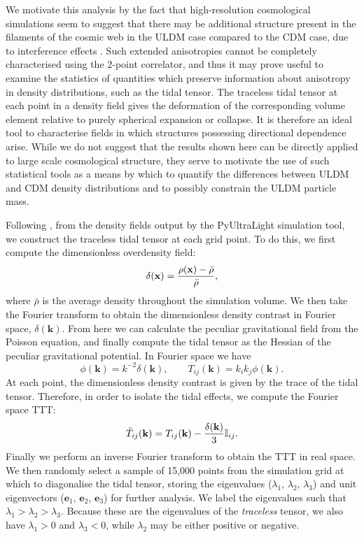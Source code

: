 \documentclass[a4paper,11pt]{article}
\begin{document}
We motivate this analysis by the fact that high-resolution cosmological simulations seem to suggest that there may be additional structure present in the filaments of the cosmic web in the ULDM case compared to the CDM case, due to interference effects \cite{Mocz:2019emo}. Such extended anisotropies cannot be completely characterised using the 2-point correlator, and thus it may prove useful to examine the statistics of quantities which preserve information about anisotropy in density distributions, such as the tidal tensor. The traceless tidal tensor at each point in a density field gives the deformation of the corresponding volume element relative to purely spherical expansion or collapse. It is therefore an ideal tool to characterise fields in which structures possessing directional dependence arise. While we do not suggest that the results shown here can be directly applied to large scale cosmological structure, they serve to motivate the use of such statistical tools as a means by which to quantify the differences between ULDM and CDM density distributions and to possibly constrain the ULDM particle mass. 

Following \cite{Lee:2009uv}, from the density fields output by the {\sc PyUltraLight} simulation tool, we construct the traceless tidal tensor at each grid point. To do this, we first compute the dimensionless overdensity field:
\begin{equation}
    \delta(\mathrm{\mathbf{x}}) = \frac{\rho(\mathrm{\mathbf{x}})-\Bar{\rho}}{\bar{\rho}}, 
\end{equation}
where $\bar{\rho}$ is the average density throughout the simulation volume. We then take the Fourier transform to obtain the dimensionless density contrast in Fourier space, $\delta(\mathrm{\mathbf{k}})$. From here we can calculate the peculiar gravitational field from the Poisson equation, and finally compute the tidal tensor as the Hessian of the peculiar gravitational potential. In Fourier space we have
\begin{equation}
    \phi(\mathrm{\mathbf{k}}) = k^{-2}\delta(\mathrm{\mathbf{k}}), \qquad T_{ij}(\mathrm{\mathbf{k}}) = k_{i}k_{j}\phi(\mathrm{\mathbf{k}}).
\end{equation}
At each point, the dimensionless density contrast is given by the trace of the tidal tensor. Therefore, in order to isolate the tidal effects, we compute the Fourier space TTT:
\begin{equation}
    \Tilde{T}_{ij}(\mathrm{\mathbf{k}}) = T_{ij}(\mathrm{\mathbf{k}}) - \frac{\delta(\mathrm{\mathbf{k}})}{3}\mathbb{I}_{ij}.
\end{equation}
Finally we perform an inverse Fourier transform to obtain the TTT in real space. We then randomly select a sample of 15,000 points from the simulation grid at which to diagonalise the tidal tensor, storing the eigenvalues ($\lambda_1$, $\lambda_2$, $\lambda_3$) and unit eigenvectors ($\mathrm{\mathbf{e}}_1$, $\mathrm{\mathbf{e}}_2$, $\mathrm{\mathbf{e}}_3$) for further analysis. We label the eigenvalues such that $\lambda_1 >\lambda_2 > \lambda_3$. Because these are the eigenvalues of the \textit{traceless} tensor, we also have $\lambda_1>0$ and  $\lambda_3 < 0$, while $\lambda_2$ may be either positive or negative.
\end{document}
